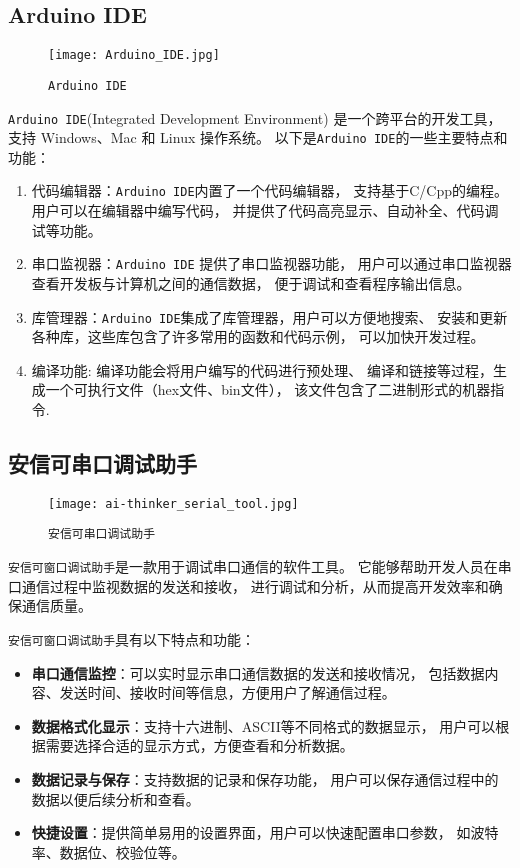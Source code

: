 \documentclass[../main.tex]{subfiles}
\begin{document}
\subsection{Arduino IDE}
\begin{figure}[H]
  \begin{center}
    \texttt{[image: Arduino\_IDE.jpg]}
  \end{center}
  \caption{\texttt{Arduino IDE}}
\end{figure}
%
\texttt{Arduino IDE}(Integrated Development Environment) 是一个跨平台的开发工具，支持 Windows、Mac 和 Linux 操作系统。
以下是\texttt{Arduino IDE}的一些主要特点和功能：
\begin{enumerate}
  \item 代码编辑器：\texttt{Arduino IDE}内置了一个代码编辑器，
    支持基于C/Cpp的编程。用户可以在编辑器中编写代码，
    并提供了代码高亮显示、自动补全、代码调试等功能。
  \item 串口监视器：\texttt{Arduino IDE} 提供了串口监视器功能，
    用户可以通过串口监视器查看开发板与计算机之间的通信数据，
    便于调试和查看程序输出信息。
  \item 库管理器：\texttt{Arduino IDE}集成了库管理器，用户可以方便地搜索、
    安装和更新各种库，这些库包含了许多常用的函数和代码示例，
    可以加快开发过程。
  \item 编译功能: 编译功能会将用户编写的代码进行预处理、
    编译和链接等过程，生成一个可执行文件（hex文件、bin文件），
    该文件包含了二进制形式的机器指令.
\end{enumerate}
%
\subsection{安信可串口调试助手}
\begin{figure}[H]
  \begin{center}
    \texttt{[image: ai-thinker\_serial\_tool.jpg]}
  \end{center}
  \caption{\texttt{安信可串口调试助手}}
\end{figure}
%
\texttt{安信可窗口调试助手}是一款用于调试串口通信的软件工具。
它能够帮助开发人员在串口通信过程中监视数据的发送和接收，
进行调试和分析，从而提高开发效率和确保通信质量。

\texttt{安信可窗口调试助手}具有以下特点和功能：
\begin{itemize}
  \item \textbf{串口通信监控}：可以实时显示串口通信数据的发送和接收情况，
    包括数据内容、发送时间、接收时间等信息，方便用户了解通信过程。
  \item \textbf{数据格式化显示}：支持十六进制、ASCII等不同格式的数据显示，
    用户可以根据需要选择合适的显示方式，方便查看和分析数据。
  \item \textbf{数据记录与保存}：支持数据的记录和保存功能，
    用户可以保存通信过程中的数据以便后续分析和查看。
  \item \textbf{快捷设置}：提供简单易用的设置界面，用户可以快速配置串口参数，
    如波特率、数据位、校验位等。
\end{itemize}
\end{document}

